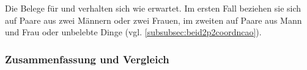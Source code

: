 

Die Belege für  und  verhalten sich wie
erwartet. Im ersten Fall beziehen sie sich auf Paare aus zwei Männern oder zwei
Frauen, im zweiten auf Paare aus Mann und Frau oder unbelebte Dinge (vgl.
\cref{subsubsec:beid2p2coordncao}).



\subsubsection{Zusammenfassung und Vergleich}
\label{subsubsec:anaperssum}

